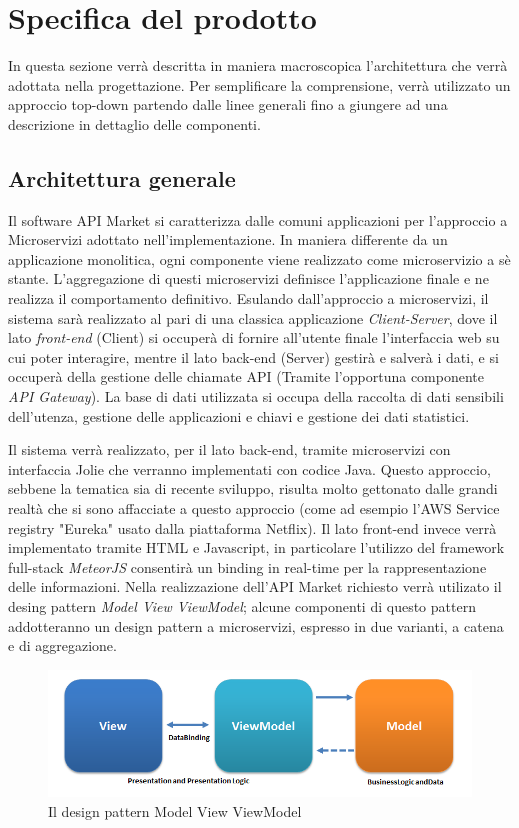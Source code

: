 \newpage
\section{Specifica del prodotto}
In questa sezione verrà descritta in maniera macroscopica l'architettura che verrà adottata nella progettazione. Per semplificare la comprensione, verrà utilizzato un approccio top-down partendo dalle linee generali fino a giungere ad una descrizione in dettaglio delle componenti.

\subsection{Architettura generale}
Il software API Market si caratterizza dalle comuni applicazioni per l'approccio a Microservizi adottato nell'implementazione. In maniera differente da un applicazione monolitica, ogni componente viene realizzato come microservizio a sè stante. L'aggregazione di questi microservizi definisce l'applicazione finale e ne realizza il comportamento definitivo. Esulando dall'approccio a microservizi, il sistema sarà realizzato al pari di una classica applicazione \textit{Client-Server}, dove il lato \textit{front-end} (Client) si occuperà di fornire all'utente finale l'interfaccia web su cui poter interagire, mentre il lato back-end (Server) gestirà e salverà i dati, e si occuperà della gestione delle chiamate API (Tramite l'opportuna componente \textit{API Gateway}). La base di dati utilizzata si occupa della raccolta di dati sensibili dell'utenza, gestione delle applicazioni e chiavi e gestione dei dati statistici.

Il sistema verrà realizzato, per il lato back-end, tramite microservizi con interfaccia Jolie che verranno implementati con codice Java. Questo approccio, sebbene la tematica sia di recente sviluppo, risulta molto gettonato dalle grandi realtà che si sono affacciate a questo approccio (come ad esempio l'AWS Service registry "Eureka" usato dalla piattaforma Netflix). Il lato front-end invece verrà implementato tramite HTML e Javascript, in particolare l'utilizzo del framework full-stack \textit{MeteorJS} consentirà un binding in real-time per la rappresentazione delle informazioni.
Nella realizzazione dell'API Market richiesto verrà utilizato il desing pattern \textit{Model View ViewModel}; alcune componenti di questo pattern addotteranno un design pattern a microservizi, espresso in due varianti, a catena e di aggregazione.
\begin{figure}[H]
	\centering
	\includegraphics[width=0.7\linewidth]{IMG/MVVMPattern}
	\caption{Il design pattern Model View ViewModel}
\end{figure}

